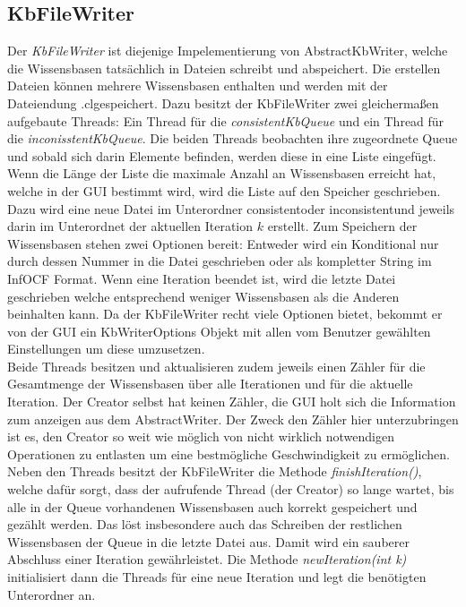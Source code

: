 \documentclass[12pt,a4paper]{article}
\begin{document}
\subsection{KbFileWriter}
\label{sec:kbfilewriter}
Der \textit{KbFileWriter} ist diejenige Impelementierung von AbstractKbWriter, welche die Wissensbasen tatsächlich in Dateien schreibt und abspeichert. Die erstellen Dateien können mehrere Wissensbasen enthalten und werden mit der Dateiendung \glqq .cl\grqq \space gespeichert. Dazu besitzt der KbFileWriter zwei gleichermaßen aufgebaute Threads: Ein Thread für die \textit{consistentKbQueue} und ein Thread für die \textit{inconisstentKbQueue}. Die beiden Threads beobachten ihre zugeordnete Queue und sobald sich darin Elemente befinden, werden diese in eine Liste eingefügt. Wenn die Länge der Liste die maximale Anzahl an Wissensbasen erreicht hat, welche in der GUI bestimmt wird, wird die Liste auf den Speicher geschrieben. Dazu wird eine neue  Datei im Unterordner \glqq consistent\grqq \space oder \glqq inconsistent\grqq \space  und jeweils darin im Unterordnet der aktuellen Iteration $k$ erstellt. Zum Speichern der Wissensbasen stehen zwei Optionen bereit: Entweder wird ein Konditional nur durch dessen Nummer in die Datei geschrieben oder als kompletter String im InfOCF Format. Wenn eine Iteration beendet ist, wird die letzte Datei geschrieben welche entsprechend weniger Wissensbasen als die Anderen beinhalten kann. Da der KbFileWriter recht viele Optionen bietet, bekommt er von der GUI ein KbWriterOptions Objekt mit allen vom Benutzer gewählten Einstellungen um diese umzusetzen.\\
Beide Threads besitzen und aktualisieren zudem jeweils einen Zähler für die Gesamtmenge der Wissensbasen über alle Iterationen und für die aktuelle Iteration. Der Creator selbst hat keinen Zähler, die GUI holt sich die Information zum anzeigen aus dem AbstractWriter. Der Zweck den Zähler hier unterzubringen ist es, den Creator so weit wie möglich von nicht wirklich notwendigen Operationen zu entlasten um eine bestmögliche Geschwindigkeit zu ermöglichen.\\
Neben den Threads besitzt der KbFileWriter die Methode \textit{finishIteration()}, welche dafür sorgt, dass der aufrufende Thread (der Creator) so lange wartet, bis alle in der Queue vorhandenen Wissensbasen auch korrekt gespeichert und gezählt werden. Das löst insbesondere auch das Schreiben der restlichen Wissensbasen der Queue in die letzte Datei aus. Damit wird ein sauberer Abschluss einer Iteration gewährleistet. Die Methode \textit{newIteration(int k)} initialisiert dann die Threads für eine neue Iteration und legt die benötigten Unterordner an. \\
\end{document}

